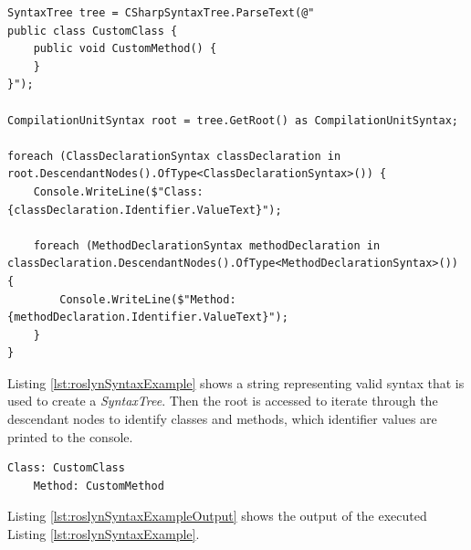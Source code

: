 \begin{lstlisting}[style=CSharp, caption={Syntax Example}, label={lst:roslynSyntaxExample}]
SyntaxTree tree = CSharpSyntaxTree.ParseText(@"
public class CustomClass {
	public void CustomMethod() {
	}
}");

CompilationUnitSyntax root = tree.GetRoot() as CompilationUnitSyntax;

foreach (ClassDeclarationSyntax classDeclaration in root.DescendantNodes().OfType<ClassDeclarationSyntax>()) {
	Console.WriteLine($"Class: {classDeclaration.Identifier.ValueText}");
	
	foreach (MethodDeclarationSyntax methodDeclaration in classDeclaration.DescendantNodes().OfType<MethodDeclarationSyntax>()) {
		Console.WriteLine($"Method: {methodDeclaration.Identifier.ValueText}");
	}
}
\end{lstlisting}
Listing \ref{lst:roslynSyntaxExample} shows a string representing valid \csharp syntax that is used to create a \textit{SyntaxTree}. Then the root is accessed to iterate through the descendant nodes to identify classes and methods, which identifier values are printed to the console.
\begin{lstlisting}[caption={Syntax Example Output}, label={lst:roslynSyntaxExampleOutput}]
	Class: CustomClass
	Method: CustomMethod
\end{lstlisting}
Listing \ref{lst:roslynSyntaxExampleOutput} shows the output of the executed Listing \ref{lst:roslynSyntaxExample}.

